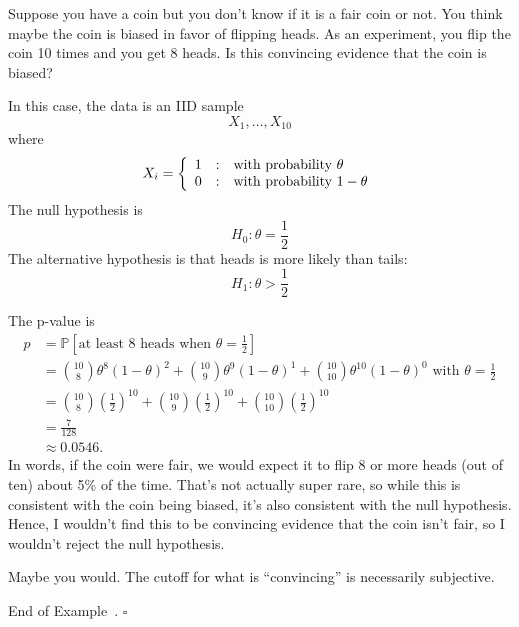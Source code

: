 \documentclass[10pt]{article}
\theoremstyle{definition}
\newtheorem{example}[theorem]{Example}
\renewenvironment{example}
{\begin{oldexample}}
  {\par\smallskip\hfill   End of Example~\theexample. $\square$    \par\end{oldexample}}
\newcommand{\1}[1]{\textbf{1}_{\left[#1\right]}} %
\def\P{\mathbb{P}} %
\begin{document}
\begin{example}
  Suppose you have a coin but you don't know if it is a fair coin or not. You
  think maybe the coin is biased in favor of flipping heads. As an experiment,
  you flip the coin 10 times and you get 8 heads. Is this convincing evidence
  that the coin is biased?

  In this case, the data is an IID sample
  \begin{equation*}
    X_{1},\ldots,X_{10}
  \end{equation*}
  where
  \begin{equation*}
    X_{i}= \left\{ \begin{array}{l@{\quad:\quad}l} 1 & \text{with probability }\theta\\ 0&\text{with probability }1-\theta \end{array}\right.
  \end{equation*}
  The null hypothesis is
  \begin{equation*}
    H_{0}: \theta=\frac{1}{2}
  \end{equation*}
  The alternative hypothesis is that heads is more likely than tails:
  \begin{equation*}
    H_{1}: \theta>\frac{1}{2}
  \end{equation*}

  The p-value is
  \begin{align*}
    p 
    &= \P\left[\text{at least 8 heads when } \theta=\frac{1}{2} \right]\\
    &= {10 \choose 8}\theta^{8}(1-\theta)^{2}+{10 \choose
      9}\theta^{9}(1-\theta)^{1}+{10 \choose 10}\theta^{10}(1-\theta)^{0}
      \text{ with } \theta=\frac{1}{2}\\
    &= {10\choose 8} \left( \frac{1}{2} \right)^{10} +{10\choose 9} \left( \frac{1}{2} \right)^{10} +{10\choose 10} \left( \frac{1}{2} \right)^{10}\\ 
    &= \frac{7}{128}\\
    &\approx 0.0546.
  \end{align*}
  In words, if the coin were fair, we would expect it to flip 8 or more heads
  (out of ten) about 5\% of the time. That's not actually super rare, so while
  this is consistent with the coin being biased, it's also consistent with the
  null hypothesis. Hence, I wouldn't find this to be convincing evidence that
  the coin isn't fair, so I wouldn't reject the null hypothesis.

  Maybe you would. The cutoff for what is ``convincing'' is necessarily subjective.
\end{example}
\end{document}
